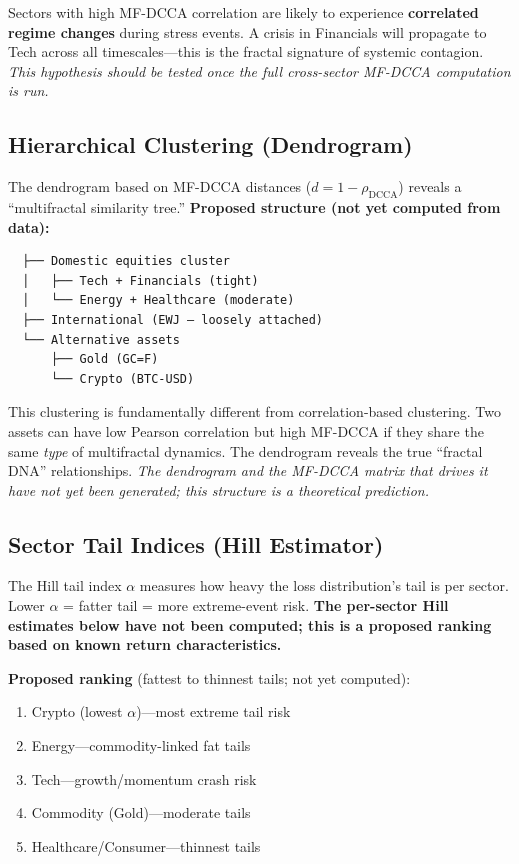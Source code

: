 \documentclass[11pt,a4paper]{article}
\begin{document}
\begin{tipbox}
Sectors with high MF-DCCA correlation are likely to experience \textbf{correlated regime changes} during stress events. A crisis in Financials will propagate to Tech across all timescales---this is the fractal signature of systemic contagion. \textit{This hypothesis should be tested once the full cross-sector MF-DCCA computation is run.}
\end{tipbox}

\subsection{Hierarchical Clustering (Dendrogram)}

The dendrogram based on MF-DCCA distances ($d = 1 - \rho_{\text{DCCA}}$) reveals a ``multifractal similarity tree.'' \textbf{Proposed structure (not yet computed from data):}

\begin{verbatim}
  ├── Domestic equities cluster
  │   ├── Tech + Financials (tight)
  │   └── Energy + Healthcare (moderate)
  ├── International (EWJ — loosely attached)
  └── Alternative assets
      ├── Gold (GC=F)
      └── Crypto (BTC-USD)
\end{verbatim}

\begin{notebox}
This clustering is fundamentally different from correlation-based clustering. Two assets can have low Pearson correlation but high MF-DCCA if they share the same \emph{type} of multifractal dynamics. The dendrogram reveals the true ``fractal DNA'' relationships. \textit{The dendrogram and the MF-DCCA matrix that drives it have not yet been generated; this structure is a theoretical prediction.}
\end{notebox}

\subsection{Sector Tail Indices (Hill Estimator)}

The Hill tail index $\alpha$ measures how heavy the loss distribution's tail is per sector. Lower $\alpha$ = fatter tail = more extreme-event risk. \textbf{The per-sector Hill estimates below have not been computed; this is a proposed ranking based on known return characteristics.}

\textbf{Proposed ranking} (fattest to thinnest tails; not yet computed):
\begin{enumerate}[nosep]
\item Crypto (lowest $\alpha$)---most extreme tail risk
\item Energy---commodity-linked fat tails
\item Tech---growth/momentum crash risk
\item Commodity (Gold)---moderate tails
\item Healthcare/Consumer---thinnest tails
\end{enumerate}
\end{document}
